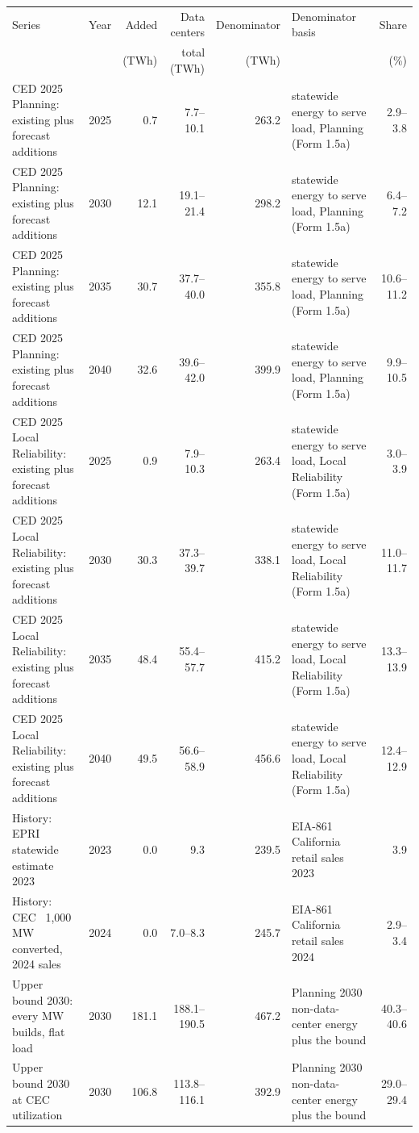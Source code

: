 \begin{tabular}{p{5.2cm}rrrrp{4.6cm}r}
\toprule
Series & Year & Added & Data centers & Denominator & Denominator basis & Share \\
 & & (TWh) & total (TWh) & (TWh) & & (\%) \\
\midrule
CED 2025 Planning: existing plus forecast additions & 2025 & 0.7 & 7.7--10.1 & 263.2 & statewide energy to serve load, Planning (Form 1.5a) & 2.9--3.8 \\
CED 2025 Planning: existing plus forecast additions & 2030 & 12.1 & 19.1--21.4 & 298.2 & statewide energy to serve load, Planning (Form 1.5a) & 6.4--7.2 \\
CED 2025 Planning: existing plus forecast additions & 2035 & 30.7 & 37.7--40.0 & 355.8 & statewide energy to serve load, Planning (Form 1.5a) & 10.6--11.2 \\
CED 2025 Planning: existing plus forecast additions & 2040 & 32.6 & 39.6--42.0 & 399.9 & statewide energy to serve load, Planning (Form 1.5a) & 9.9--10.5 \\
CED 2025 Local Reliability: existing plus forecast additions & 2025 & 0.9 & 7.9--10.3 & 263.4 & statewide energy to serve load, Local Reliability (Form 1.5a) & 3.0--3.9 \\
CED 2025 Local Reliability: existing plus forecast additions & 2030 & 30.3 & 37.3--39.7 & 338.1 & statewide energy to serve load, Local Reliability (Form 1.5a) & 11.0--11.7 \\
CED 2025 Local Reliability: existing plus forecast additions & 2035 & 48.4 & 55.4--57.7 & 415.2 & statewide energy to serve load, Local Reliability (Form 1.5a) & 13.3--13.9 \\
CED 2025 Local Reliability: existing plus forecast additions & 2040 & 49.5 & 56.6--58.9 & 456.6 & statewide energy to serve load, Local Reliability (Form 1.5a) & 12.4--12.9 \\
History: EPRI statewide estimate 2023 & 2023 & 0.0 & 9.3 & 239.5 & EIA-861 California retail sales 2023 & 3.9 \\
History: CEC ~1,000 MW converted, 2024 sales & 2024 & 0.0 & 7.0--8.3 & 245.7 & EIA-861 California retail sales 2024 & 2.9--3.4 \\
Upper bound 2030: every MW builds, flat load & 2030 & 181.1 & 188.1--190.5 & 467.2 & Planning 2030 non-data-center energy plus the bound & 40.3--40.6 \\
Upper bound 2030 at CEC utilization & 2030 & 106.8 & 113.8--116.1 & 392.9 & Planning 2030 non-data-center energy plus the bound & 29.0--29.4 \\
\bottomrule
\end{tabular}
